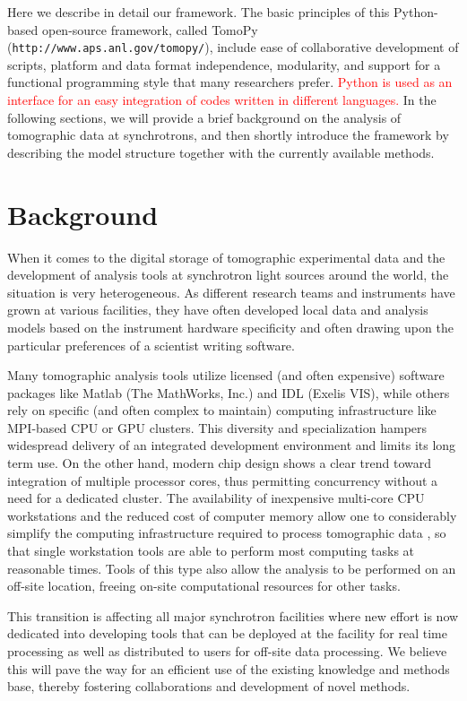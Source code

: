 \documentclass[pdf]{iucr}              %
\begin{document}
Here we describe in detail our framework. The basic principles of this Python-based open-source framework, called TomoPy (\texttt{http://www.aps.anl.gov/tomopy/}), include ease of collaborative development of scripts, platform and data format independence, modularity,  and support for a functional programming style that many researchers prefer. \textcolor{red}{Python is used as an interface for an easy integration of codes written in different languages.} In the following sections, we will provide a brief background on the analysis of tomographic data at synchrotrons, and then shortly introduce the framework by describing the model structure together with the currently available methods. 


\section{Background}

When it comes to the digital storage of tomographic experimental data and the development of analysis tools at synchrotron light sources around the world, the situation is very heterogeneous. As different research teams and instruments have grown at various facilities, they have often developed local data and analysis models based on the instrument hardware specificity and often drawing upon the particular preferences of a scientist writing software. 

Many tomographic analysis tools utilize licensed (and often expensive) software packages like Matlab (The MathWorks, Inc.) and IDL (Exelis VIS), while others rely on specific (and often complex to maintain) computing infrastructure like MPI-based CPU or GPU clusters. This diversity and specialization hampers widespread delivery of an integrated development environment and limits its long term use. On the other hand, modern chip design shows a clear trend toward integration of multiple processor cores, thus permitting concurrency without a need for a dedicated cluster. The availability of inexpensive multi-core CPU workstations and the reduced cost of computer memory allow one to considerably simplify the computing infrastructure required to process tomographic data \cite{rivers_spie_2012}, so that single workstation tools are able to perform most computing tasks at reasonable times. Tools of this type also allow the analysis to be performed on an off-site location, freeing on-site computational resources for other tasks. 

This transition is affecting all major synchrotron facilities where new effort is now dedicated into developing tools that can be deployed at the facility for real time processing as well as distributed to users for off-site data processing. We believe this will pave the way for an efficient use of the existing knowledge and methods base, thereby fostering collaborations and development of novel methods.
\end{document}
